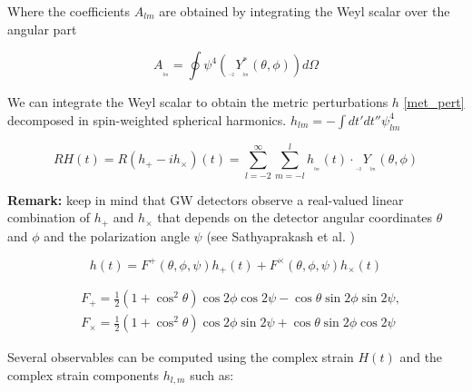 Where the coefficients $A_{lm}$ are obtained by integrating the Weyl scalar over the angular  part

\begin{equation}
A_{_{_{lm}}} = \oint \psi^4({}_{_{_{-2}}}Y^{*}_{_{_{lm}}}(\theta, \phi)) d\Omega
\end{equation}

We can integrate the Weyl scalar to obtain the metric perturbations $h$ \ref{met_pert} decomposed in spin-weighted spherical harmonics.
$ h_{lm} = - \int dt' dt'' \psi_{lm}^4$
 
\begin{equation}\label{fvr}
RH(t) = R(h_+ - ih_{\times})(t) = \sum_{l=-2}^{\infty}  \sum_{m=-l}^{l} h_{_{_{lm}}}(t) \cdot {}_{_{_{-2}}}Y_{_{_{lm}}}(\theta, \phi)
\end{equation}

\begin{mdframed}
\textbf{Remark:} keep in mind that  GW detectors observe a real-valued linear combination of $h_+$ and $h_\times$ that depends on the detector angular coordinates $\theta$ and $\phi$  and the polarization angle $\psi$ (see Sathyaprakash et al. \cite[section 4.2.1]{Sathyaprakash:2009xs})

\begin{equation}
h(t) = F^{+}(\theta, \phi, \psi) h_+(t) + F^{\times}(\theta, \phi, \psi) h_{\times}(t)
\end{equation}

\begin{equation}
\begin{aligned}
& F_{+}=\frac{1}{2}\left(1+\cos ^2 \theta\right) \cos 2 \phi \cos 2 \psi-\cos \theta \sin 2 \phi \sin 2 \psi, \\
& F_{\times}=\frac{1}{2}\left(1+\cos ^2 \theta\right) \cos 2 \phi \sin 2 \psi+\cos \theta \sin 2 \phi \cos 2 \psi
\end{aligned}
\end{equation}
\end{mdframed}


Several observables can be computed using the complex strain $H(t)$ and the complex strain components $h_{l,m}$ such as:

